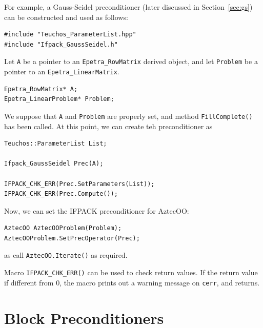 For example, a Gauss-Seidel preconditioner (later discussed in
Section~\ref{sec:gs}) can be constructed and used as follows:
\begin{verbatim}
#include "Teuchos_ParameterList.hpp"
#include "Ifpack_GaussSeidel.h"
\end{verbatim}
Let \verb!A! be a pointer to an \verb!Epetra_RowMatrix! derived object,
  and let \verb!Problem! be a pointer to an \verb!Epetra_LinearMatrix!.
\begin{verbatim}
Epetra_RowMatrix* A;  
Epetra_LinearProblem* Problem;
\end{verbatim}
We suppose that \verb!A! and 
\verb!Problem! are properly set, and
method \verb~FillComplete()~ has been called. At this point, we can create teh
preconditioner as
\begin{verbatim}
Teuchos::ParameterList List;

Ifpack_GaussSeidel Prec(A);

IFPACK_CHK_ERR(Prec.SetParameters(List));
IFPACK_CHK_ERR(Prec.Compute());
\end{verbatim}
Now, we can set the IFPACK preconditioner for AztecOO:
\begin{verbatim}
AztecOO AztecOOProblem(Problem);
AztecOOProblem.SetPrecOperator(Prec);
\end{verbatim}
as call \verb!AztecOO.Iterate()! as required.

Macro \verb!IFPACK_CHK_ERR()! can be used to check return values. If the
return value if different from 0, the macro prints out a warning message on
\verb!cerr!, and returns.

\section{Block Preconditioners}
\label{sec:block}

